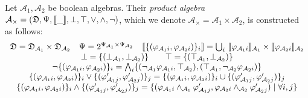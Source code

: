 \begin{definition}
    Let $\mathcal{A}_1, \mathcal{A}_2$ be boolean algebras.
    Their \emph{product algebra}
    $\mathcal{A}_\times = (\mathfrak{D}, \Psi, \llbracket {\_} \rrbracket, \bot, \top, \vee, \wedge, \neg)$,
    which we denote $\mathcal{A}_\times = \mathcal{A}_1 \times \mathcal{A}_2$,
    is constructed as follows:
    $$\begin{array}{c}
        \mathfrak{D} = \mathfrak{D}_{\mathcal{A}_1} \times \mathfrak{D}_{\mathcal{A}_2} \quad
        \Psi = 2^{\Psi_{\mathcal{A}_1} \times \Psi_{\mathcal{A}_2}} \quad
        \llbracket {\{(\varphi_{\mathcal{A}_1i}, \varphi_{\mathcal{A}_2i})\}_i} \rrbracket = 
            \textstyle\bigcup_i ~\llbracket {\varphi_{\mathcal{A}_1i}} \rrbracket_{\mathcal{A}_1}
            \times \llbracket {\varphi_{\mathcal{A}_2i}} \rrbracket_{\mathcal{A}_2} \\
        \bot = \{(\bot_{\mathcal{A}_1}, \bot_{\mathcal{A}_2})\} \qquad
        \top = \{(\top_{\mathcal{A}_1}, \bot_{\mathcal{A}_2})\} \\
        \neg\{(\varphi_{\mathcal{A}_1i}, \varphi_{\mathcal{A}_2i})\}_i =
            \textstyle\bigwedge_i\{(\neg_{\mathcal{A}_1} \varphi_{\mathcal{A}_1i}, \top_{\mathcal{A}_2}),
            (\top_{\mathcal{A}_1}, \neg_{\mathcal{A}_2} \varphi_{\mathcal{A}_2i})\}\\        
        \{(\varphi_{\mathcal{A}_1i}, \varphi_{\mathcal{A}_2i})\}_i \vee
            \{(\varphi_{\mathcal{A}_1j}', \varphi_{\mathcal{A}_2j}')\}_j = 
            \{(\varphi_{\mathcal{A}_1i}, \varphi_{\mathcal{A}_2i})\}_i \cup
            \{(\varphi_{\mathcal{A}_1j}', \varphi_{\mathcal{A}_2j}')\}_j \\ 
        \{(\varphi_{\mathcal{A}_1i}, \varphi_{\mathcal{A}_2i})\}_i \wedge
            \{(\varphi_{\mathcal{A}_1j}', \varphi_{\mathcal{A}_2j}')\}_j = 
            \{(\varphi_{\mathcal{A}_1i} \wedge_{\mathcal{A}_1} \varphi_{\mathcal{A}_1j}',
            \varphi_{\mathcal{A}_2i} \wedge_{\mathcal{A}_2} \varphi_{\mathcal{A}_2j}')
            \mid \forall i,j\} \\
    \end{array}$$
\end{definition}

